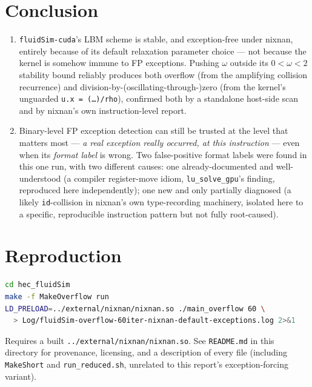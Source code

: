 \documentclass[11pt,a4paper]{article}
\begin{document}
\section{Conclusion}

\begin{enumerate}
  \item \texttt{fluidSim-cuda}'s LBM scheme is stable, and exception-free
    under nixnan, entirely because of its default relaxation parameter
    choice --- not because the kernel is somehow immune to FP exceptions.
    Pushing $\omega$ outside its $0 < \omega < 2$ stability bound reliably
    produces both overflow (from the amplifying collision recurrence) and
    division-by-(oscillating-through-)zero (from the kernel's unguarded
    \texttt{u.x = (\ldots)/rho}), confirmed both by a standalone host-side
    scan and by nixnan's own instruction-level report.
  \item Binary-level FP exception detection can still be trusted at the
    level that matters most --- \emph{a real exception really occurred,
    at this instruction} --- even when its \emph{format label} is wrong.
    Two false-positive format labels were found in this one run, with two
    different causes: one already-documented and well-understood (a
    compiler register-move idiom, \texttt{lu\_solve\_gpu}'s finding,
    reproduced here independently); one new and only partially diagnosed
    (a likely \texttt{id}-collision in nixnan's own type-recording
    machinery, isolated here to a specific, reproducible instruction
    pattern but not fully root-caused).
\end{enumerate}

\section*{Reproduction}

\begin{lstlisting}[language=bash]
cd hec_fluidSim
make -f MakeOverflow run
LD_PRELOAD=../external/nixnan/nixnan.so ./main_overflow 60 \
  > Log/fluidSim-overflow-60iter-nixnan-default-exceptions.log 2>&1
\end{lstlisting}
Requires a built \texttt{../external/nixnan/nixnan.so}. See
\texttt{README.md} in this directory for provenance, licensing, and a
description of every file (including \texttt{MakeShort} and
\texttt{run\_reduced.sh}, unrelated to this report's exception-forcing
variant).
\end{document}
